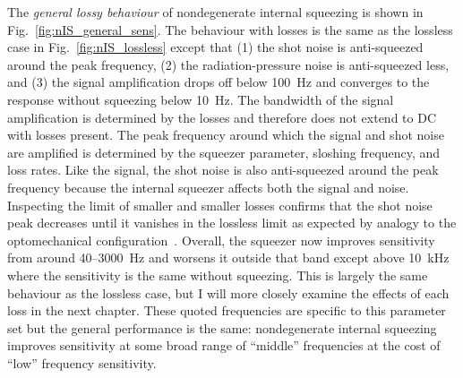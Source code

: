 The \emph{general lossy behaviour} of nondegenerate internal squeezing is shown in Fig.~\ref{fig:nIS_general_sens}. 
The behaviour with losses is the same as the lossless case in Fig.~\ref{fig:nIS_lossless} except that (1) the shot noise is anti-squeezed around the peak frequency, (2) the radiation-pressure noise is anti-squeezed less, and (3) the signal amplification drops off below 100~Hz and converges to the response without squeezing below 10~Hz. The bandwidth of the signal amplification is determined by the losses and therefore does not extend to DC with losses present. The peak frequency around which the signal and shot noise are amplified is determined by the squeezer parameter, sloshing frequency, and loss rates.
Like the signal, the shot noise is also anti-squeezed around the peak frequency because the internal squeezer affects both the signal and noise. %
Inspecting the limit of smaller and smaller losses confirms that the shot noise peak decreases until it vanishes in the lossless limit as expected by analogy to the optomechanical configuration~\cite{liBroadbandSensitivityImprovement2020}.
Overall, the squeezer now improves sensitivity from around 40--3000~Hz and worsens it outside that band except above 10~kHz where the sensitivity is the same without squeezing. This is largely the same behaviour as the lossless case, but I will more closely examine the effects of each loss in the next chapter.
These quoted frequencies are specific to this parameter set but the general performance is the same: nondegenerate internal squeezing improves sensitivity at some broad range of ``middle'' frequencies at the cost of ``low'' frequency sensitivity. 


